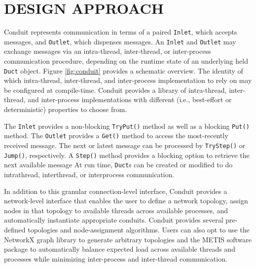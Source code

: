\section{DESIGN APPROACH}



Conduit represents communication in terms of a paired \texttt{Inlet}, which accepts messages, and \texttt{Outlet}, which dispenses messages.
An \texttt{Inlet} and \texttt{Outlet} may exchange messages via an intra-thread, inter-thread, or inter-process communication procedure, depending on the runtime state of an underlying held \texttt{Duct} object.
Figure \ref{fig:conduit} provides a schematic overview.
The identity of which intra-thread, inter-thread, and inter-process implementation to rely on may be configured at compile-time.
Conduit provides a library of intra-thread, inter-thread, and inter-process implementations with different (i.e., best-effort or deterministic) properties to choose from.

The \texttt{Inlet} provides a non-blocking \texttt{TryPut()} method as well as a blocking \texttt{Put()} method.
The \texttt{Outlet} provides a \texttt{Get()} method to access the most-recently received message.
The next or latest message can be processed by \texttt{TryStep()} or \texttt{Jump()}, respectively.
A \texttt{Step()} method provides a blocking option to retrieve the next available message
At run time, \texttt{Duct}s can be created or modified to do intrathread, interthread, or interprocess communication. 

In addition to this granular connection-level interface, Conduit provides a network-level interface that enables the user to define a network topology, assign nodes in that topology to available threads across available processes, and automatically instantiate appropriate conduits.
Conduit provides several pre-defined topologies and node-assignment algorithms. 
Users can also opt to use the NetworkX graph library \cite{hagberg2008exploring} to generate arbitrary topologies and the METIS software package \cite{gupta1997fast} to automatically balance expected load across available threads and processes while minimizing inter-process and inter-thread communication.